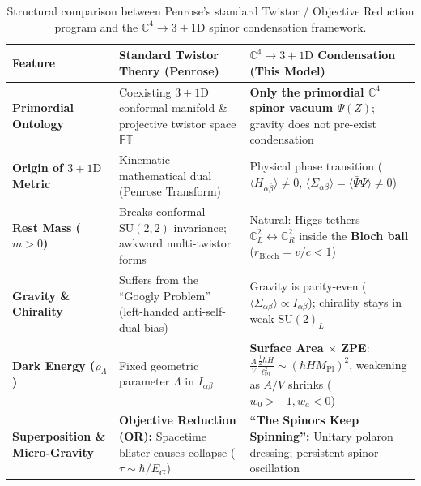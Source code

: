 \documentclass[11pt,a4paper]{article}
\begin{document}
\begin{table}[H]
\centering
\small
\renewcommand{\arraystretch}{1.28}
\begin{tabularx}{\textwidth}{>{\raggedright\arraybackslash}p{} >{\raggedright\arraybackslash}p{} >{\raggedright\arraybackslash}X}
\toprule
\textbf{Feature} & \textbf{Standard Twistor Theory (Penrose)} & \textbf{$\mathbb{C}^4 \to 3+1\text{D}$ Condensation (This Model)} \\
\midrule
\textbf{Primordial Ontology} & Coexisting $3+1\text{D}$ conformal manifold \& projective twistor space $\mathbb{PT}$ & \textbf{Only the primordial $\mathbb{C}^4$ spinor vacuum $\Psi(Z)$}; gravity does not pre-exist condensation \\
\addlinespace
\textbf{Origin of $3+1\text{D}$ Metric} & Kinematic mathematical dual (Penrose Transform) & Physical phase transition ($\langle H_{\alpha\bar{\beta}}\rangle \neq 0$, $\langle\Sigma_{\alpha\beta}\rangle = \langle\bar{\Psi}\Psi\rangle \neq 0$) \\
\addlinespace
\textbf{Rest Mass ($m > 0$)} & Breaks conformal $\text{SU}(2,2)$ invariance; awkward multi-twistor forms & Natural: Higgs tethers $\mathbb{C}^2_L \leftrightarrow \mathbb{C}^2_R$ inside the \textbf{Bloch ball} ($r_{\text{Bloch}} = v/c < 1$) \\
\addlinespace
\textbf{Gravity \& Chirality} & Suffers from the ``Googly Problem'' (left-handed anti-self-dual bias) & Gravity is parity-even ($\langle\Sigma_{\alpha\beta}\rangle \propto I_{\alpha\beta}$); chirality stays in weak $\text{SU}(2)_L$ \\
\addlinespace
\textbf{Dark Energy ($\rho_\Lambda$)} & Fixed geometric parameter $\Lambda$ in $I_{\alpha\beta}$ & \textbf{Surface Area $\times$ ZPE}: $\frac{A}{V}\frac{\frac{1}{2}\hbar H}{\ell_{\text{Pl}}^2} \sim (\hbar H M_{\text{Pl}})^2$, weakening as $A/V$ shrinks ($w_0 > -1, w_a < 0$) \\
\addlinespace
\textbf{Superposition \& Micro-Gravity} & \textbf{Objective Reduction (OR):} Spacetime blister causes collapse ($\tau \sim \hbar/E_G$) & \textbf{``The Spinors Keep Spinning'':} Unitary polaron dressing; persistent spinor oscillation \\
\bottomrule
\end{tabularx}
\caption{Structural comparison between Penrose's standard Twistor / Objective Reduction program and the $\mathbb{C}^4 \to 3+1\text{D}$ spinor condensation framework.}
\label{tab:twistor_comparison}
\end{table}
\end{document}

